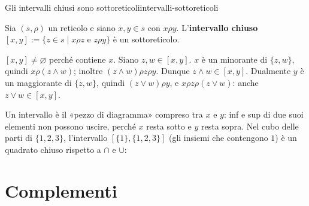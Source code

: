 \begin{concetto}
\begin{Proposizione}{Gli intervalli chiusi sono sottoreticoli}{intervalli-sottoreticoli}
    \begin{prerequisiti}
    \end{prerequisiti}
    Sia $(s, \rho)$ un reticolo e siano $x, y \in s$ con $x \rho y$. L'\textbf{intervallo chiuso} $[x, y] := \{z \in s \mid x \rho z \text{ e } z \rho y\}$ è un sottoreticolo.
\end{Proposizione}
\begin{dimostrazione}
    $[x, y] \neq \varnothing$ perché contiene $x$. Siano $z, w \in [x, y]$. $x$ è un minorante di $\{z, w\}$, quindi $x \rho (z \wedge w)$; inoltre $(z \wedge w) \rho z \rho y$.
    Dunque $z \wedge w \in [x, y]$. Dualmente $y$ è un maggiorante di $\{z, w\}$, quindi $(z \vee w) \rho y$, e $x \rho z \rho (z \vee w)$: anche $z \vee w \in [x, y]$.
\end{dimostrazione}
\end{concetto}

\begin{spiegazione}
    Un intervallo è il «pezzo di diagramma» compreso tra $x$ e $y$: inf e sup di due suoi elementi non possono uscire, perché $x$ resta sotto e $y$
    resta sopra. Nel cubo delle parti di $\{1, 2, 3\}$, l'intervallo $[\{1\}, \{1, 2, 3\}]$ (gli insiemi che contengono $1$) è un quadrato chiuso rispetto
    a $\cap$ e $\cup$:
    \begin{center}
    \end{center}
\end{spiegazione}

\section{Complementi}\label{sec:complementi}

